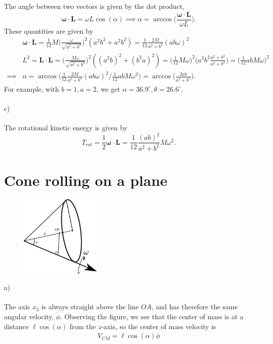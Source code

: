\documentclass{article}
\begin{document}
        The angle between two vectors is given by the dot product,
        \begin{equation*}
            \boldsymbol \omega \cdot \mathbf{L} = \omega L \cos(\alpha) \implies \alpha = \arccos\bigg( \frac{\boldsymbol \omega \cdot \mathbf{L}}{\omega L}\bigg).
        \end{equation*}
        These quantities are given by
        \begin{align*}
            &\boldsymbol \omega \cdot \mathbf{L}  = \frac{1}{12} M \bigg( \frac{\omega}{\sqrt{a^2 + b^2}}\bigg)^2 (a^2b^2 + a^2b^2) = \frac{1}{12}\frac{2M}{a^2+ b^2} ( ab\omega)^2 \\
            &L^2 = \mathbf{L} \cdot \mathbf{L} = \bigg(\frac{M \omega}{\sqrt{a^2 + b^2}}\bigg)^2 ((a^2b)^2 + (b^2a)^2) = \bigg( \frac{1}{12}M \omega\bigg)^2 \bigg( a^2b^2\frac{a^2 + b^2}{a^2 + b^2}\bigg) = \bigg( \frac{1}{12} abM\omega \bigg)^2 \\
        \implies & \alpha = \arccos \bigg( 
            \frac{1}{12}\frac{2M}{a^2+ b^2} ( ab\omega)^2 \bigg/ \frac{1}{12} abM\omega^2 \bigg)
            = \arccos\bigg(\frac{2ab}{a^2 + b^2}\bigg).
        \end{align*}
        For example, with $b=1, a=2$, we get $\alpha = 36.9^\circ, \theta = 26.6^\circ$.
        \\ \\
        c) 
        \\ \\
        The rotational kinetic energy is given by 
        \begin{equation*}
            T_{rot} = \frac{1}{2} \boldsymbol \omega \cdot \mathbf{L} = \frac{1}{12}\frac{( ab)^2}{a^2+ b^2} M \omega^2.
    \end{equation*}

    \section{Cone rolling on a plane}
        \begin{figure}
            \includegraphics[width=0.35\textwidth]{figures/exercise_7_3_cone2.pdf}
        \end{figure}
        a) \\ \\
        The axis $x_3$ is always straight above the line $OA$, and has therefore the same angular velocity, $\dot \phi$. Observing the figure, we see that the center of mass is at a distance $\ell \cos(\alpha)$ from the $z$-axis, so the center of mass velocity is
        \begin{equation*}
            V_{CM} = \ell \cos(\alpha) \dot \phi
        \end{equation*} 
\end{document}
